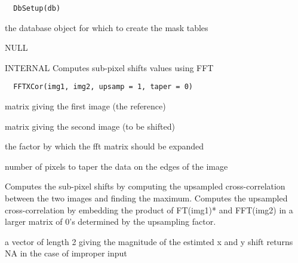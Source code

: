 \documentclass[a4paper]{book}
\begin{document}
%
\begin{Usage}
\begin{verbatim}
  DbSetup(db)
\end{verbatim}
\end{Usage}
%
\begin{Arguments}
\begin{ldescription}
\item[\code{db}] the database object for which to create the
mask tables
\end{ldescription}
\end{Arguments}
%
\begin{Value}
NULL
\end{Value}
%
\begin{Description}\relax
INTERNAL Computes sub-pixel shifts values using FFT
\end{Description}
%
\begin{Usage}
\begin{verbatim}
  FFTXCor(img1, img2, upsamp = 1, taper = 0)
\end{verbatim}
\end{Usage}
%
\begin{Arguments}
\begin{ldescription}
\item[\code{img1}] matrix giving the first image (the
reference)

\item[\code{img2}] matrix giving the second image (to be
shifted)

\item[\code{upsamp}] the factor by which the fft matrix should
be expanded

\item[\code{taper}] number of pixels to taper the data on the
edges of the image
\end{ldescription}
\end{Arguments}
%
\begin{Details}\relax
Computes the sub-pixel shifts by computing the upsampled
cross-correlation between the two images and finding the
maximum. Computes the upsampled cross-correlation by
embedding the product of FT(img1)* and FFT(img2) in a
larger matrix of 0's determined by the upsampling factor.
\end{Details}
%
\begin{Value}
a vector of length 2 giving the magnitude of the estimted
x and y shift returns NA in the case of improper input
\end{Value}
\end{document}
